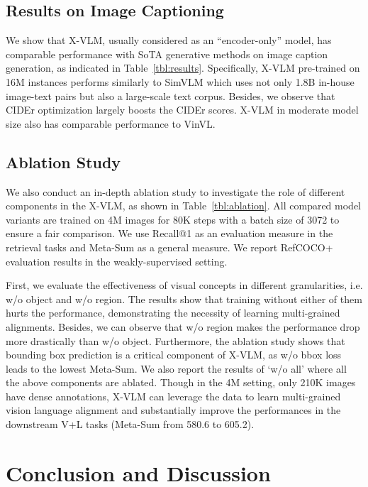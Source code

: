 \documentclass[nohyperref]{article}
\theoremstyle{plain}
\theoremstyle{definition}
\theoremstyle{remark}
\begin{document}
\subsection{Results on Image Captioning}


We show that X-VLM, usually considered as an ``encoder-only'' model, has comparable performance with SoTA generative methods on image caption generation, as indicated in Table~\ref{tbl:results}. Specifically, X-VLM pre-trained on 16M instances performs similarly to SimVLM which uses not only 1.8B in-house image-text pairs but also a large-scale text corpus. Besides, we observe that CIDEr optimization largely boosts the CIDEr scores. X-VLM in moderate model size also has comparable performance to VinVL. 


\subsection{Ablation Study} 


We also conduct an in-depth ablation study to investigate the role of different components in the X-VLM, as shown in Table~\ref{tbl:ablation}. All compared model variants are trained on 4M images for 80K steps with a batch size of 3072 to ensure a fair comparison. We use Recall@1 as an evaluation measure in the retrieval tasks and Meta-Sum as a general measure. We report RefCOCO+ evaluation results in the weakly-supervised setting. 


First, we evaluate the effectiveness of visual concepts in different granularities, i.e. w/o object and w/o region. The results show that training without either of them hurts the performance, demonstrating the necessity of learning multi-grained alignments. Besides, we can observe that w/o region makes the performance drop more drastically than w/o object. Furthermore, the ablation study shows that bounding box prediction is a critical component of X-VLM, as w/o bbox loss leads to the lowest Meta-Sum. We also report the results of `w/o all' where all the above components are ablated. Though in the 4M setting, only 210K images have dense annotations, X-VLM can leverage the data to learn multi-grained vision language alignment and substantially improve the performances in the downstream V+L tasks (Meta-Sum from 580.6 to 605.2). 



\section{Conclusion and Discussion}
\end{document}
